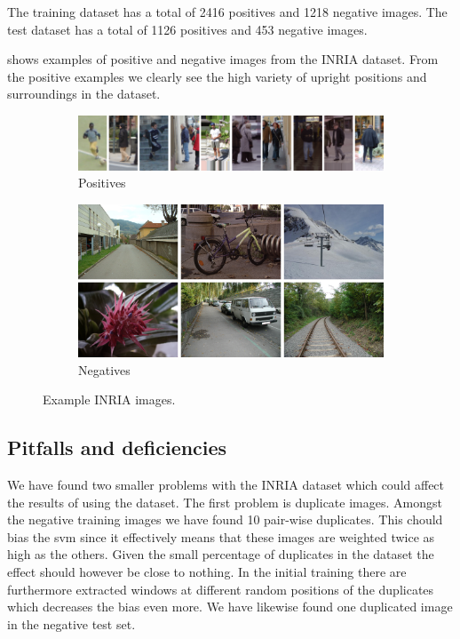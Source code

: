 \documentclass[thesis.tex]{subfiles}
\begin{document}
The training dataset has a total of 2416 positives and 1218 negative images.
The test dataset has a total of 1126 positives and 453 negative images.

 shows examples of positive  and negative  images from the INRIA dataset. From the positive examples we clearly see the high variety of upright positions and surroundings in the dataset.

\begin{figure}
	\centering
	\begin{subfigure}[t]{\textwidth}
		\includegraphics[width=\textwidth]{img/inriaPositives.png}
		\caption{Positives}
		\label{fig:inriaPositives}
		\vspace{2mm}
	\end{subfigure}
	\begin{subfigure}[t]{\textwidth}
		\includegraphics[width=\textwidth]{img/inriaNegatives.png}
		\caption{Negatives}
		\label{fig:inriaNegatives}
	\end{subfigure}
	\caption{Example INRIA images.}
	\label{fig:inriaExampleImages}
\end{figure}

\subsection{Pitfalls and deficiencies}
We have found two smaller problems with the INRIA dataset which could affect the results of using the dataset. The first problem is duplicate images. Amongst the negative training images we have found 10 pair-wise duplicates. This chould bias the svm since it effectively means that these images are weighted twice as high as the others. Given the small percentage of duplicates in the dataset the effect should however be close to nothing. In the initial training there are furthermore extracted windows at different random positions of the duplicates which decreases the bias even more. We have likewise found one duplicated image in the negative test set.
\end{document}
